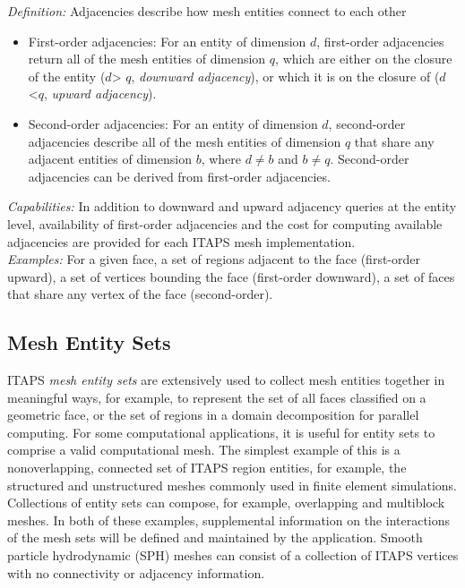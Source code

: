 \documentclass{article}
\begin{document}
\emph{Definition:} Adjacencies describe how mesh entities connect 
to each other

\begin{itemize} 
\item  
First-order adjacencies: For an entity of dimension $d$, first-order 
adjacencies return all of the mesh entities of dimension $q$, 
which are either on the closure of the entity ($d$> $q$, \emph{downward 
adjacency}), or which it is on the closure of ($d$ <$q$, \emph{upward 
adjacency}). 
\item  
Second-order adjacencies: For an entity of dimension $d$, second-order 
adjacencies describe all of the mesh entities of dimension $q$ 
that share any adjacent entities of dimension $b$, where $d \neq b$ 
and $b \neq q$. Second-order adjacencies can be derived 
from first-order adjacencies. 
\end{itemize}


\emph{Capabilities:} In addition to downward and upward adjacency 
queries at the entity level, availability of first-order adjacencies 
and the cost for computing available adjacencies are provided 
for each ITAPS mesh implementation.\\



\emph{Examples:} For a given face, a set of regions adjacent to 
the face (first-order upward), a set of vertices bounding the 
face (first-order downward), a set of faces that share any vertex 
of the face (second-order).

\subsection{Mesh Entity Sets}

ITAPS \emph{mesh entity sets} are extensively used to collect mesh 
entities together in meaningful ways, for example, to represent 
the set of all faces classified on a geometric face, or the set 
of regions in a domain decomposition for parallel computing. 
For some computational applications, it is useful for entity 
sets to comprise a valid computational mesh. The simplest example 
of this is a nonoverlapping, connected set of ITAPS region entities, 
for example, the structured and unstructured meshes commonly 
used in finite element simulations. Collections of entity sets 
can compose, for example, overlapping and multiblock meshes. 
In both of these examples, supplemental information on the interactions 
of the mesh sets will be defined and maintained by the application. 
Smooth particle hydrodynamic (SPH) meshes can consist of a collection 
of ITAPS vertices with no connectivity or adjacency information.\\
\end{document}
